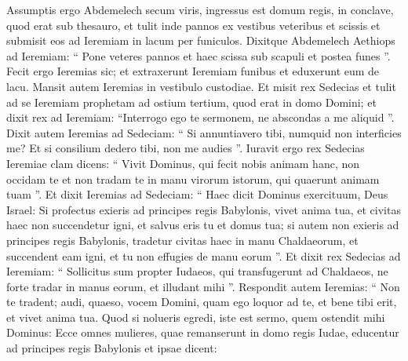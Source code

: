 \begin{biblechapter}
\begin{biblechapter}
\begin{biblechapter}
\begin{biblechapter}
\begin{biblechapter}
\begin{biblechapter}
\begin{biblechapter}
\begin{biblechapter}
\begin{biblechapter}
\begin{biblechapter}
\begin{biblechapter}
\begin{biblechapter}
\begin{biblechapter}
\begin{biblechapter}
\begin{biblechapter}
\begin{biblechapter}
\begin{biblechapter}
\begin{biblechapter}
\begin{biblechapter}
\begin{biblechapter}
\begin{biblechapter}
\begin{biblechapter}
\begin{biblechapter}
\begin{biblechapter}
\begin{biblechapter}
\begin{biblechapter}
\begin{biblechapter}
\begin{biblechapter}
\begin{biblechapter}
\begin{biblechapter}
\begin{biblechapter}
\begin{biblechapter}
\begin{biblechapter}
\begin{biblechapter}
\begin{biblechapter}
\begin{biblechapter}
\begin{biblechapter}
\begin{biblechapter}
\verse Assumptis ergo Abdemelech secum viris, ingressus est domum regis, in conclave, quod erat sub thesauro, et tulit inde pannos ex vestibus veteribus et scissis et submisit eos ad Ieremiam in lacum per funiculos. 
\verse Dixitque Abdemelech Aethiops ad Ieremiam: “ Pone veteres pannos et haec scissa sub scapuli et postea funes ”. Fecit ergo Ieremias sic; 
 \verse et extraxerunt Ieremiam funibus et eduxerunt eum de lacu. Mansit autem Ieremias in vestibulo custodiae.
 \verse Et misit rex Sedecias et tulit ad se Ieremiam prophetam ad ostium tertium, quod erat in domo Domini; et dixit rex ad Ieremiam: “Interrogo ego te sermonem, ne abscondas a me aliquid ”. 
\verse Dixit autem Ieremias ad Sedeciam: “ Si annuntiavero tibi, numquid non interficies me? Et si consilium dedero tibi, non me audies ”. 
\verse Iuravit ergo rex Sedecias Ieremiae clam dicens: “ Vivit Dominus, qui fecit nobis animam hanc, non occidam te et non tradam te in manu virorum istorum, qui quaerunt animam tuam ”. 
\verse Et dixit Ieremias ad Sedeciam: “ Haec dicit Dominus exercituum, Deus Israel: Si profectus exieris ad principes regis Babylonis, vivet anima tua, et civitas haec non succendetur igni, et salvus eris tu et domus tua; 
\verse si autem non exieris ad principes regis Babylonis, tradetur civitas haec in manu Chaldaeorum, et succendent eam igni, et tu non effugies de manu eorum ”. 
\verse Et dixit rex Sedecias ad Ieremiam: “ Sollicitus sum propter Iudaeos, qui transfugerunt ad Chaldaeos, ne forte tradar in manus eorum, et illudant mihi ”. 
\verse Respondit autem Ieremias: “ Non te tradent; audi, quaeso, vocem Domini, quam ego loquor ad te, et bene tibi erit, et vivet anima tua. 
\verse Quod si nolueris egredi, iste est sermo, quem ostendit mihi Dominus: 
\verse Ecce omnes mulieres, quae remanserunt in domo regis Iudae, educentur ad principes regis Babylonis et ipsae dicent:

\end{biblechapter}
\end{biblechapter}
\end{biblechapter}
\end{biblechapter}
\end{biblechapter}
\end{biblechapter}
\end{biblechapter}
\end{biblechapter}
\end{biblechapter}
\end{biblechapter}
\end{biblechapter}
\end{biblechapter}
\end{biblechapter}
\end{biblechapter}
\end{biblechapter}
\end{biblechapter}
\end{biblechapter}
\end{biblechapter}
\end{biblechapter}
\end{biblechapter}
\end{biblechapter}
\end{biblechapter}
\end{biblechapter}
\end{biblechapter}
\end{biblechapter}
\end{biblechapter}
\end{biblechapter}
\end{biblechapter}
\end{biblechapter}
\end{biblechapter}
\end{biblechapter}
\end{biblechapter}
\end{biblechapter}
\end{biblechapter}
\end{biblechapter}
\end{biblechapter}
\end{biblechapter}
\end{biblechapter}
